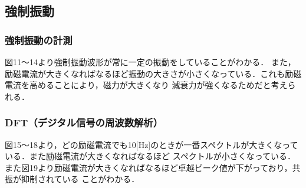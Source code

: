 \documentclass[a4paper,10.5pt]{jsarticle}
\begin{document}
\subsection{強制振動}
\subsubsection{強制振動の計測}
図11〜14より強制振動波形が常に一定の振動をしていることがわかる．
また，励磁電流が大きくなればなるほど振動の大きさが小さくなっている．これも励磁電流を高めることにより，磁力が大きくなり
減衰力が強くなるためだと考えられる．
\subsubsection{DFT（デジタル信号の周波数解析）}
図15〜18より，どの励磁電流でも10[Hz]のときが一番スペクトルが大きくなっている．また励磁電流が大きくなればなるほど
スペクトルが小さくなっている．また図19より励磁電流が大きくなればなるほど卓越ピーク値が下がっており，共振が抑制されている
ことがわかる．
\end{document}
